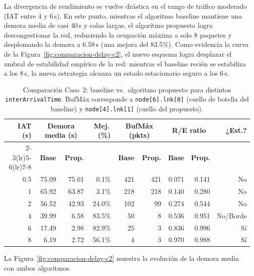 \documentclass[10pt,letterpaper,twocolumn]{article}
\begin{document}
La divergencia de rendimiento se vuelve drástica en el rango de tráfico moderado (IAT entre 4 y 6\,s). En este punto, mientras el algoritmo baseline mantiene una demora media de casi 40\,s y colas largas, el algoritmo propuesto logra descongestionar la red, reduciendo la ocupación máxima a solo 8 paquetes y desplomando la demora a 6.58\,s (una mejora del 83.5\%). Como evidencia la curva de la Figura~\ref{fig:comparacion-delay-c2}, el nuevo esquema logra desplazar el umbral de estabilidad empírico de la red: mientras el baseline recién se estabiliza a los 8\,s, la nueva estrategia alcanza un estado estacionario seguro a los 6\,s.

\begin{table}[!t]
  \centering
  \caption{Comparación Caso~2: baseline vs.\ algoritmo propuesto para
           distintos \texttt{interArrivalTime}. BufMáx corresponde a
           \texttt{node[6].lnk[0]} (cuello de botella del baseline) y
           \texttt{node[4].lnk[1]} (cuello del propuesto).}
  \label{tab:comparacion-c2}
  \begin{tabular}{@{}rrrrrrrrr@{}}
    \toprule
    \multirow{2}{*}{\textbf{IAT (s)}} &
    \multicolumn{2}{c}{\textbf{Demora media (s)}} &
    \multirow{2}{*}{\textbf{Mej.\,(\%)}} &
    \multicolumn{2}{c}{\textbf{BufMáx (pkts)}} &
    \multicolumn{2}{c}{\textbf{R/E ratio}} &
    \multirow{2}{*}{\textbf{¿Est.?}} \\
    \cmidrule(lr){2-3}\cmidrule(lr){5-6}\cmidrule(lr){7-8}
    & \textbf{Base} & \textbf{Prop.} & &
      \textbf{Base} & \textbf{Prop.} &
      \textbf{Base} & \textbf{Prop.} & \\
    \midrule
    0.5 & 75.09 & 75.01 &  0.1\% & 421 & 421 & 0.071 & 0.141 & No \\
    1   & 65.92 & 63.87 &  3.1\% & 218 & 218 & 0.140 & 0.280 & No \\
    2   & 56.52 & 42.93 & 24.0\% & 102 &  99 & 0.274 & 0.544 & No \\
    4   & 39.99 &  6.58 & 83.5\% &  50 &   8 & 0.536 & 0.951 & No/Borde \\
    6   & 17.49 &  2.98 & 82.9\% &  25 &   3 & 0.836 & 0.996 & Sí \\
    8   &  6.19 &  2.72 & 56.1\% &   4 &   3 & 0.970 & 0.988 & Sí \\
    \bottomrule
  \end{tabular}
\end{table}

La Figura~\ref{fig:comparacion-delay-c2} muestra la evolución de la demora
media con ambos algoritmos.
\end{document}
